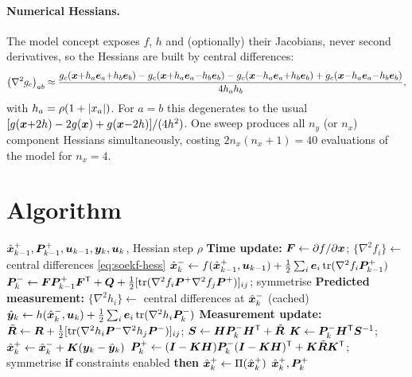 \paragraph{Numerical Hessians.} The model concept exposes $f$, $h$ and (optionally) their
Jacobians, never second derivatives, so the Hessians are built by central differences:
\begin{equation}
\left(\nabla^2 g_c\right)_{ab} \approx
\frac{g_c(\bm{x}{+}h_a\bm e_a{+}h_b\bm e_b) - g_c(\bm{x}{+}h_a\bm e_a{-}h_b\bm e_b)
 - g_c(\bm{x}{-}h_a\bm e_a{+}h_b\bm e_b) + g_c(\bm{x}{-}h_a\bm e_a{-}h_b\bm e_b)}{4h_ah_b},
\label{eq:soekf-hess}
\end{equation}
with $h_a = \rho(1+\left\lvert x_a \right\rvert)$. For $a=b$ this degenerates to the usual
$[g(\bm{x}{+}2h)-2g(\bm{x})+g(\bm{x}{-}2h)]/(4h^2)$. One sweep produces all $n_y$ (or $n_x$) component
Hessians simultaneously, costing $2n_x(n_x{+}1) = 40$ evaluations of the model for $n_x = 4$.

\section{Algorithm}
\begin{algorithm}[H]
\caption{SO-EKF --- one sampling period}
\begin{algorithmic}[1]
\Require $\hat{\bm{x}}^{+}_{k-1},\bm{P}^{+}_{k-1},\bm{u}_{k-1},\bm{y}_k,\bm{u}_k$, Hessian step $\rho$
\State \textbf{Time update:} $\bm{F}\gets\partial f/\partial\bm{x}$;\;
       $\{\nabla^2f_i\}\gets$ central differences \eqref{eq:soekf-hess}
\State $\hat{\bm{x}}^{-}_k\gets f(\hat{\bm{x}}^{+}_{k-1},\bm{u}_{k-1})+\tfrac12\sum_i\bm e_i\operatorname{tr}(\nabla^2f_i\bm{P}^{+}_{k-1})$
\State $\bm{P}^{-}_k\gets\bm{F}\bm{P}^{+}_{k-1}\bm{F}^{\mathsf{T}}+\bm{Q}+\tfrac12[\operatorname{tr}(\nabla^2f_i\bm{P}^{+}\nabla^2f_j\bm{P}^{+})]_{ij}$; symmetrise
\State \textbf{Predicted measurement:} $\{\nabla^2h_i\}\gets$ central differences at $\hat{\bm{x}}^{-}_k$ (cached)
\State $\hat{\bm{y}}_k\gets h(\hat{\bm{x}}^{-}_k,\bm{u}_k)+\tfrac12\sum_i\bm e_i\operatorname{tr}(\nabla^2h_i\bm{P}^{-}_k)$
\State \textbf{Measurement update:}
       $\tilde{\bm{R}}\gets\bm{R}+\tfrac12[\operatorname{tr}(\nabla^2h_i\bm{P}^{-}\nabla^2h_j\bm{P}^{-})]_{ij}$;\;
       $\bm{S}\gets\bm{H}\bm{P}^{-}_k\bm{H}^{\mathsf{T}}+\tilde{\bm{R}}$
\State $\bm{K}\gets\bm{P}^{-}_k\bm{H}^{\mathsf{T}}\bm{S}^{-1}$;\; $\hat{\bm{x}}^{+}_k\gets\hat{\bm{x}}^{-}_k+\bm{K}(\bm{y}_k-\hat{\bm{y}}_k)$
\State $\bm{P}^{+}_k\gets(\bm{I}-\bm{K}\bm{H})\bm{P}^{-}_k(\bm{I}-\bm{K}\bm{H})^{\mathsf{T}}+\bm{K}\tilde{\bm{R}}\bm{K}^{\mathsf{T}}$; symmetrise
\State \textbf{if} constraints enabled \textbf{then} $\hat{\bm{x}}^{+}_k\gets\Pi(\hat{\bm{x}}^{+}_k)$
\Ensure $\hat{\bm{x}}^{+}_k,\bm{P}^{+}_k$
\end{algorithmic}
\end{algorithm}

